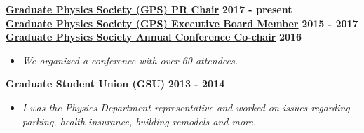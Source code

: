 \documentclass[margin]{res}
\begin{document}
\begin{resume}
{\bf \href{gradphysics.nd.edu}{Graduate Physics Society (GPS) PR Chair}} \hfill {\bf 2017 - present}\\
{\bf \href{gradphysics.nd.edu}{Graduate Physics Society (GPS) Executive Board Member}} \hfill {\bf 2015 - 2017}
\\
{\bf \href{http://gradphysics.nd.edu/conference/gpsac-2016/}{Graduate Physics Society Annual Conference Co-chair}} \hfill {\bf 2016 }
    \begin{itemize}\itemsep -2pt
    \item[] \textit{\small{We organized a conference with over 60 attendees.}} %
    \end{itemize} \vspace{-12pt}
{\bf Graduate Student Union (GSU)} \hfill {\bf 2013 - 2014}
    \begin{itemize}\itemsep -2pt
    \item[] \textit{\small{I was the Physics Department representative and worked on issues regarding \\parking, health insurance, building remodels and more.}}

\end{itemize}
\end{resume}
\end{document}
